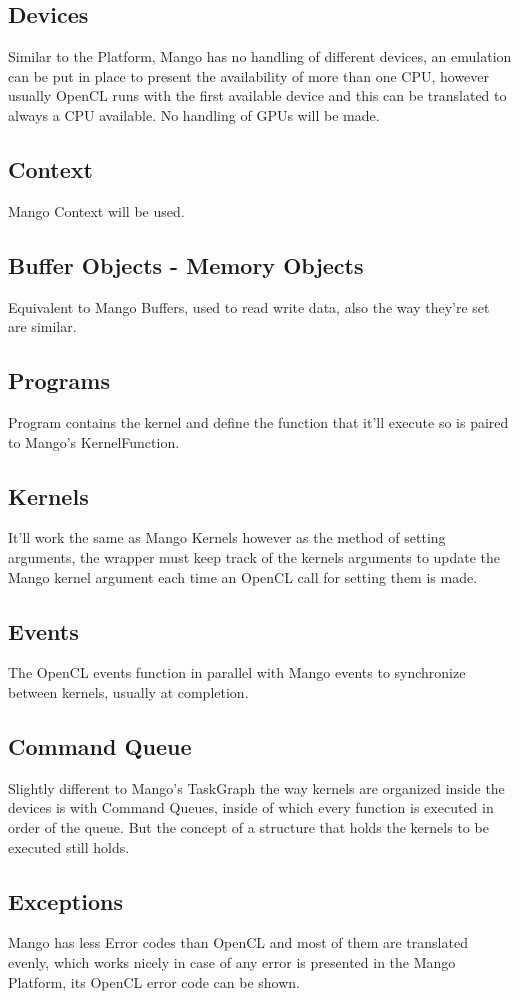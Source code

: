 \documentclass[a4paper]{article}
\begin{document}
\subsection{Devices}
Similar to the Platform, Mango has no handling of different devices, an emulation can be put in place to present the availability of more than one CPU, however usually OpenCL runs with the first available device and this can be translated to always a CPU available. No handling of GPUs will be made.
\subsection{Context}
Mango Context will be used.
\subsection{Buffer Objects - Memory Objects}
Equivalent to Mango Buffers, used to read write data, also the way they're set are similar.
\subsection{Programs}
Program contains the kernel and define the function that it'll execute so is paired to Mango's KernelFunction.
\subsection{Kernels}
It'll work the same as Mango Kernels however as the method of setting arguments, the wrapper must keep track of the kernels arguments to update the Mango kernel argument each time an OpenCL call for setting them is made.
\subsection{Events}
The OpenCL events function in parallel with Mango events to synchronize between kernels, usually at completion.
\subsection{Command Queue}
Slightly different to Mango's TaskGraph the way kernels are organized inside the devices is with Command Queues, inside of which every function is executed in order of the queue. But the concept of a structure that holds the kernels to be executed still holds.
\subsection{Exceptions}
Mango has less Error codes than OpenCL and most of them are translated evenly, which works nicely in case of any error is presented in the Mango Platform, its OpenCL error code can be shown.
\end{document}
